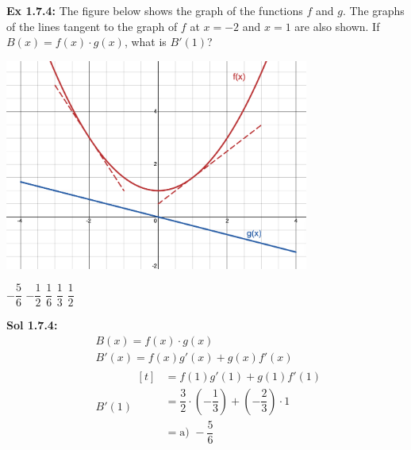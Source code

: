 \begin{tcolorbox}[example]
    \textbf{Ex 1.7.4: } The figure below shows the graph of the functions $f$ and $g$. The graphs of the lines tangent to the graph of $f$ at $x = -2$ and $x = 1$ are also shown. If $B(x) = f(x) \cdot g(x)$, what is $B'(1)$? \\

    \begin{center}
        \includegraphics[width = 0.75\textwidth]{Support/Chapter 1 Graphics/1.7-Graphic2.png}
    \end{center} \vspace{11pt}

    \begin{oneparchoices}
        \choice $-\dfrac{5}{6}$
        \choice $-\dfrac{1}{2}$
        \choice $\dfrac{1}{6}$
        \choice $\dfrac{1}{3}$
        \choice $\dfrac{1}{2}$
    \end{oneparchoices}
\end{tcolorbox}
\begin{tcolorbox}[solution]
    \textbf{Sol 1.7.4: } \begin{align*}
        & B(x) = f(x) \cdot g(x) \\[11pt]
        & B'(x) = f(x)g'(x) + g(x)f'(x) \\[11pt]
        & B'(1) \begin{aligned}[t]
            & = f(1)g'(1) + g(1)f'(1) \\[11pt]
            & = \dfrac{3}{2} \cdot \left(-\dfrac{1}{3}\right) + \left(-\dfrac{2}{3}\right) \cdot 1 \\[11pt]
            & = \boxed{\text{a) } -\dfrac{5}{6}}
        \end{aligned}
    \end{align*}
\end{tcolorbox} \vspace{11pt}

